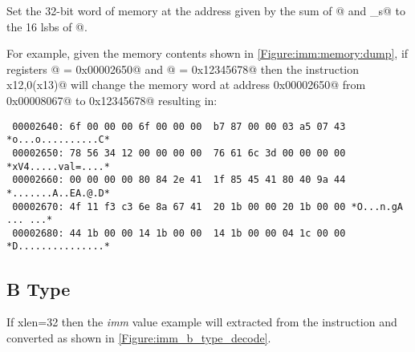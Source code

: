 \begin{itemize}
Set the 32-bit word of memory at the address given by the sum of @ and 
\verb@imm_s@ to the 16 \acrshort{lsb}s of @.

For example, given the memory contents shown in \autoref{Figure:imm:memory:dump},
if registers @ = \verb@0x00002650@ and @ = \verb@0x12345678@
then the instruction \verb@sw x12,0(x13)@ will change the memory word at address 
\verb@0x00002650@ from \verb@0x00008067@ to \verb@0x12345678@ resulting in:

\begin{verbatim}
 00002640: 6f 00 00 00 6f 00 00 00  b7 87 00 00 03 a5 07 43 *o...o..........C*
 00002650: 78 56 34 12 00 00 00 00  76 61 6c 3d 00 00 00 00 *xV4.....val=....*
 00002660: 00 00 00 00 80 84 2e 41  1f 85 45 41 80 40 9a 44 *.......A..EA.@.D*
 00002670: 4f 11 f3 c3 6e 8a 67 41  20 1b 00 00 20 1b 00 00 *O...n.gA ... ...*
 00002680: 44 1b 00 00 14 1b 00 00  14 1b 00 00 04 1c 00 00 *D...............*
\end{verbatim}

\end{itemize}

\subsection{B Type}
\label{insnformat:btype}

If \Gls{xlen}=32 then the {\em imm} value example will extracted from the instruction
and converted as shown in \autoref{Figure:imm_b_type_decode}.

\begin{figure}[ht]
\centering
\DrawInsnOpBTypeDecoding
{}
\label{Figure:imm_b_type_decode}
\label{imm.b:decode}
\end{figure}

